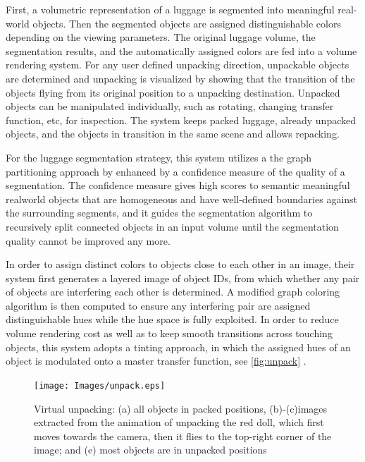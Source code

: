 First, a volumetric representation of a luggage is
segmented into meaningful real-world objects. Then the segmented
objects are assigned distinguishable colors depending on the viewing
parameters. The original luggage volume, the segmentation
results, and the automatically assigned colors are fed into a volume
rendering system. For any user defined unpacking direction,
unpackable objects are determined and unpacking is visualized by
showing that the transition of the objects flying from its original
position to a unpacking destination. Unpacked objects can be manipulated
individually, such as rotating, changing transfer function,
etc, for inspection. The system keeps packed luggage, already unpacked
objects, and the objects in transition in the same scene and
allows repacking.

For the luggage segmentation strategy, this system utilizes a the
graph partitioning approach by \cite{1580491} enhanced
by a confidence measure of the quality of a segmentation. The
confidence measure gives high scores to semantic meaningful realworld
objects that are homogeneous and have well-defined boundaries
against the surrounding segments, and it guides the segmentation
algorithm to recursively split connected objects in an input
volume until the segmentation quality cannot be improved any more.

In order to assign distinct colors to objects close to each other in
an image, their system first generates a layered image of object IDs,
from which whether any pair of objects are interfering each other
is determined. A modified graph coloring algorithm is then computed
to ensure any interfering pair are assigned distinguishable
hues while the hue space is fully exploited. In order to reduce volume
rendering cost as well as to keep smooth transitions across
touching objects, this system adopts a tinting approach, in which the assigned
hues of an object is modulated onto a master transfer function, see \autoref{fig:unpack} .


\begin{figure}
\centering
\texttt{[image: Images/unpack.eps]}
\caption[ unpack]{Virtual unpacking: (a) all objects in packed positions, (b)-(c)images extracted from the animation of unpacking the red doll, which
first moves towards the camera, then it flies to the top-right corner of the image; and (e) most objects are in unpacked positions}
\label{fig:unpack}
\end{figure}





